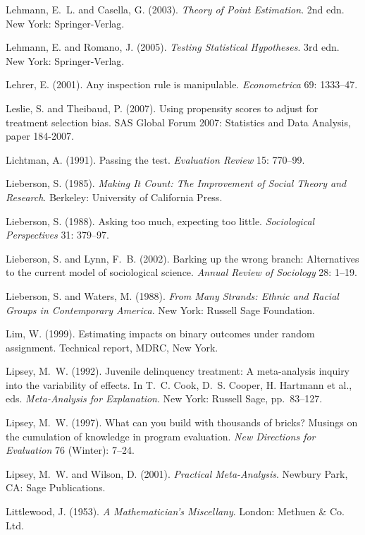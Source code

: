 \smallskip\noindent
Lehmann, E.~L. and Casella, G. (2003).
{\it Theory of Point Estimation\/}. 2nd edn.
New York: Springer-Verlag.

\smallskip\noindent
Lehmann, E. and Romano, J. (2005).
{\it Testing Statistical Hypotheses\/}. 3rd edn.
New York: Springer-Verlag.

\smallskip\noindent
Lehrer, E. (2001).
Any inspection rule is manipulable.
{\it Econometrica\/} 69: 1333--47.

\smallskip\noindent
Leslie, S. and Theibaud, P. (2007).
Using propensity scores to adjust for treatment selection bias.
SAS Global Forum 2007: Statistics and Data Analysis, paper 184-2007.

\smallskip\noindent
Lichtman, A. (1991).
Passing the test.
{\it Evaluation Review\/} 15: 770--99.

\smallskip\noindent
Lieberson, S. (1985).
{\it Making It Count: The Improvement of Social Theory and Research\/}.
Berkeley: University of California Press.

\smallskip\noindent
Lieberson, S. (1988).
Asking too much, expecting too little.
{\it Sociological Perspectives\/} 31: 379--97.

\smallskip\noindent
Lieberson, S. and Lynn, F.~B. (2002).
Barking up the wrong branch:
Alternatives to the current model of sociological science.
{\it Annual Review of Sociology\/} 28: 1--19.

\smallskip\noindent
Lieberson, S. and Waters, M. (1988).
{\it From Many Strands: Ethnic and Racial Groups in Contemporary America\/}.
New York: Russell Sage Foundation.

\smallskip\noindent
Lim, W. (1999).
Estimating impacts on binary outcomes under random assignment.
Technical report, MDRC, New York.

\smallskip\noindent
Lipsey, M.~W. (1992).
Juvenile delinquency treatment: A meta-analysis inquiry into the variability of effects.
In T.~C. Cook, D.~S. Cooper, H. Hartmann et al., eds.
{\it Meta-Analysis for Explanation\/}.
New York: Russell Sage, pp.~83--127.

\smallskip\noindent
Lipsey, M.~W. (1997).
What can you build with thousands of bricks?
Musings on the cumulation of knowledge in program evaluation.
{\it New Directions for Evaluation\/} 76 (Winter): 7--24.

\smallskip\noindent
Lipsey, M.~W. and Wilson, D. (2001).
{\it Practical Meta-Analysis\/}.
Newbury Park, CA: Sage Publications.

\smallskip\noindent
Littlewood, J. (1953).
{\it A Mathematician's Miscellany\/}.
London: Methuen \& Co. Ltd.

